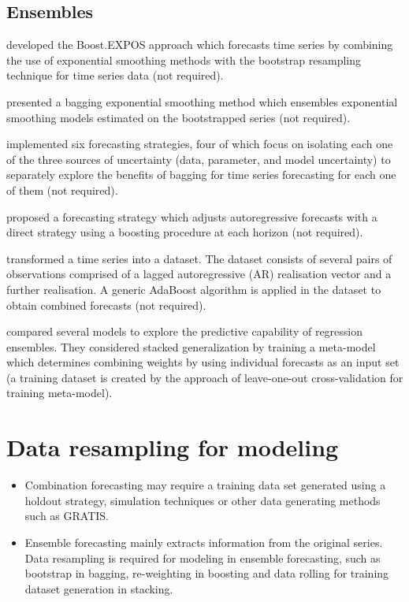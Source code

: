 \documentclass[11pt]{article}
\begin{document}
\subsection{Ensembles}

\cite{Cordeiro2009-wt} developed the Boost.EXPOS approach which forecasts time series by combining the use of exponential smoothing methods with the bootstrap resampling technique for time series data (not required).

\cite{Bergmeir2016-ae} presented a bagging exponential smoothing method which ensembles exponential smoothing models estimated on the bootstrapped series (not required).

\cite{Petropoulos2018-fw} implemented six forecasting strategies, four of which focus on isolating each one of the three sources of uncertainty (data, parameter, and model uncertainty) to separately explore the benefits of bagging for time series forecasting for each one of them (not required).

\cite{Taieb2014-yp} proposed a forecasting strategy which adjusts autoregressive forecasts with a direct strategy using a boosting procedure at each horizon (not required).

\cite{Barrow2016-wl} transformed a time series into a dataset. The dataset consists of several pairs of observations comprised of a lagged autoregressive (AR) realisation vector and a further realisation. A generic AdaBoost algorithm is applied in the dataset to obtain combined forecasts (not required).

\cite{Ribeiro2020-mj} compared several models to explore the predictive capability of regression ensembles. They considered stacked generalization by training a meta-model which determines combining weights by using individual forecasts as an input set (a training dataset is created by the approach of leave-one-out cross-validation for training meta-model).


\section{Data resampling for modeling}
\begin{itemize}
\item Combination forecasting may require a training data set generated using a holdout strategy, simulation techniques or other data generating methods such as GRATIS.
\item Ensemble forecasting mainly extracts information from the original series. Data resampling is required for modeling in ensemble forecasting, such as bootstrap in bagging, re-weighting in boosting and data rolling for training dataset generation in stacking.
\end{itemize}
\end{document}

